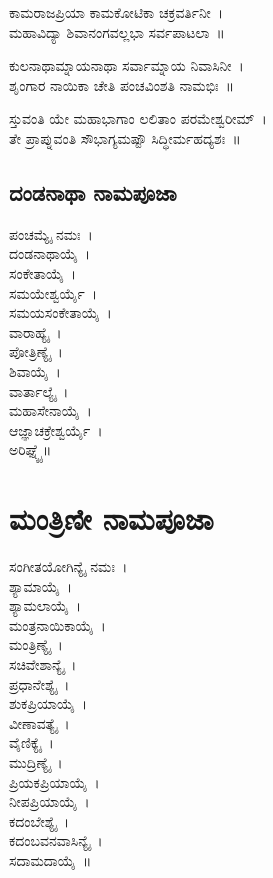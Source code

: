 ಕಾಮರಾಜಪ್ರಿಯಾ ಕಾಮಕೋಟಿಕಾ ಚಕ್ರವರ್ತಿನೀ~।\\
ಮಹಾವಿದ್ಯಾ ಶಿವಾನಂಗವಲ್ಲಭಾ ಸರ್ವಪಾಟಲಾ~॥

ಕುಲನಾಥಾಮ್ನಾಯನಾಥಾ ಸರ್ವಾಮ್ನಾಯ ನಿವಾಸಿನೀ~।\\
ಶೃಂಗಾರ ನಾಯಿಕಾ ಚೇತಿ ಪಂಚವಿಂಶತಿ ನಾಮಭಿಃ~॥

ಸ್ತುವಂತಿ ಯೇ ಮಹಾಭಾಗಾಂ ಲಲಿತಾಂ ಪರಮೇಶ್ವರೀಮ್~।\\
ತೇ ಪ್ರಾಪ್ನುವಂತಿ ಸೌಭಾಗ್ಯಮಷ್ಟೌ ಸಿದ್ಧೀರ್ಮಹದ್ಯಶಃ~॥

\begin{multicols}{2}\subsection{ದಂಡನಾಥಾ ನಾಮಪೂಜಾ}
ಪಂಚಮ್ಯೈ ನಮಃ~।\\ ದಂಡನಾಥಾಯೈ~।\\ ಸಂಕೇತಾಯೈ~।\\ ಸಮಯೇಶ್ವರ್ಯೈ~।\\ ಸಮಯಸಂಕೇತಾಯೈ~।\\ ವಾರಾಹ್ಯೈ~।\\ ಪೋತ್ರಿಣ್ಯೈ~।\\ ಶಿವಾಯೈ~।\\ ವಾರ್ತಾಲ್ಯೈ~।\\ ಮಹಾಸೇನಾಯೈ~।\\ ಆಜ್ಞಾಚಕ್ರೇಶ್ವರ್ಯೈ~।\\ ಅರಿಘ್ನ್ಯೈ॥
\section{ಮಂತ್ರಿಣೀ ನಾಮಪೂಜಾ}
ಸಂಗೀತಯೋಗಿನ್ಯೈ ನಮಃ~।\\ ಶ್ಯಾಮಾಯೈ~।\\ ಶ್ಯಾಮಲಾಯೈ~।\\ ಮಂತ್ರನಾಯಿಕಾಯೈ~।\\ ಮಂತ್ರಿಣ್ಯೈ~।\\ ಸಚಿವೇಶಾನ್ಯೈ~।\\ ಪ್ರಧಾನೇಶ್ಯೈ~।\\ ಶುಕಪ್ರಿಯಾಯೈ~।\\ ವೀಣಾವತ್ಯೈ~।\\ ವೈಣಿಕ್ಯೈ~।\\ ಮುದ್ರಿಣ್ಯೈ~।\\ ಪ್ರಿಯಕಪ್ರಿಯಾಯೈ~।\\ ನೀಪಪ್ರಿಯಾಯೈ~।\\ ಕದಂಬೇಶ್ಯೈ~।\\ ಕದಂಬವನವಾಸಿನ್ಯೈ~।\\ ಸದಾಮದಾಯೈ~॥

\end{multicols}
